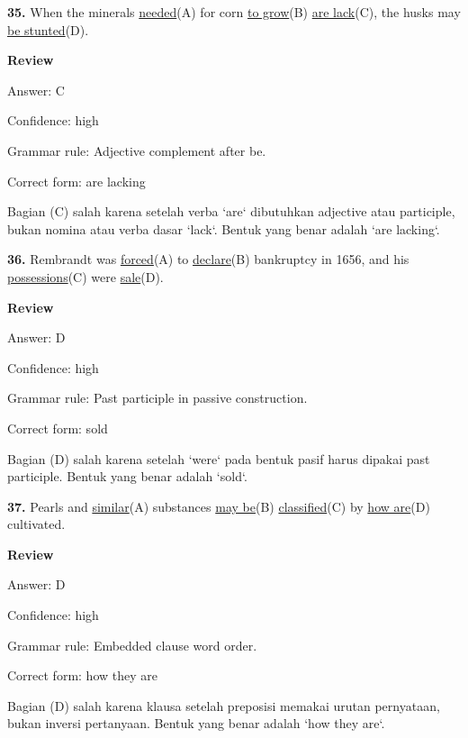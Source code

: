\documentclass[12pt]{article}
\begin{document}
\endgroup
\par
\vspace{\questionblockgap}
\noindent\textbf{35.} When the minerals \uline{needed}(A) for corn \uline{to grow}(B) \uline{are lack}(C), the husks may \uline{be stunted}(D).
\par
\begingroup
\setlength{\parskip}{0pt}
\setlength{\parindent}{0pt}
\textbf{Review}\par
Answer: C\par
Confidence: high\par
Grammar rule: Adjective complement after be.\par
Correct form: are lacking\par
Bagian (C) salah karena setelah verba `are` dibutuhkan adjective atau participle, bukan nomina atau verba dasar `lack`. Bentuk yang benar adalah `are lacking`.\par
\endgroup
\par
\vspace{\questionblockgap}
\noindent\textbf{36.} Rembrandt was \uline{forced}(A) to \uline{declare}(B) bankruptcy in 1656, and his \uline{possessions}(C) were \uline{sale}(D).
\par
\begingroup
\setlength{\parskip}{0pt}
\setlength{\parindent}{0pt}
\textbf{Review}\par
Answer: D\par
Confidence: high\par
Grammar rule: Past participle in passive construction.\par
Correct form: sold\par
Bagian (D) salah karena setelah `were` pada bentuk pasif harus dipakai past participle. Bentuk yang benar adalah `sold`.\par
\endgroup
\par
\vspace{\questionblockgap}
\noindent\textbf{37.} Pearls and \uline{similar}(A) substances \uline{may be}(B) \uline{classified}(C) by \uline{how are}(D) cultivated.
\par
\begingroup
\setlength{\parskip}{0pt}
\setlength{\parindent}{0pt}
\textbf{Review}\par
Answer: D\par
Confidence: high\par
Grammar rule: Embedded clause word order.\par
Correct form: how they are\par
Bagian (D) salah karena klausa setelah preposisi memakai urutan pernyataan, bukan inversi pertanyaan. Bentuk yang benar adalah `how they are`.\par
\end{document}
